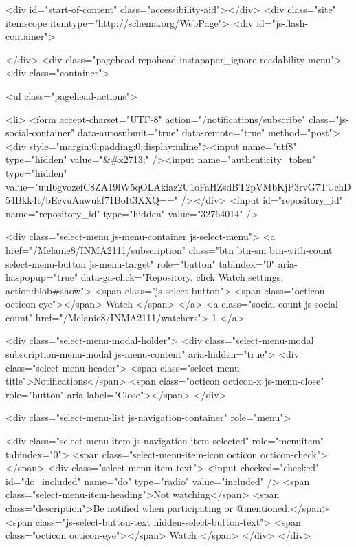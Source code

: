         

        


      <div id="start-of-content" class="accessibility-aid"></div>
          <div class="site" itemscope itemtype="http://schema.org/WebPage">
    <div id="js-flash-container">
      
    </div>
    <div class="pagehead repohead instapaper_ignore readability-menu">
      <div class="container">
        
<ul class="pagehead-actions">

  <li>
      <form accept-charset="UTF-8" action="/notifications/subscribe" class="js-social-container" data-autosubmit="true" data-remote="true" method="post"><div style="margin:0;padding:0;display:inline"><input name="utf8" type="hidden" value="&#x2713;" /><input name="authenticity_token" type="hidden" value="uuI6gvozefC8ZA19lW5qOLAkiaz2U1oFaHZsdBT2pVMbKjP3rvG7TUchD54Bkk4t/bEcvuAuwukf71BoIt3XXQ==" /></div>    <input id="repository_id" name="repository_id" type="hidden" value="32764014" />

      <div class="select-menu js-menu-container js-select-menu">
        <a href="/Melanie8/INMA2111/subscription"
          class="btn btn-sm btn-with-count select-menu-button js-menu-target" role="button" tabindex="0" aria-haspopup="true"
          data-ga-click="Repository, click Watch settings, action:blob#show">
          <span class="js-select-button">
            <span class="octicon octicon-eye"></span>
            Watch
          </span>
        </a>
        <a class="social-count js-social-count" href="/Melanie8/INMA2111/watchers">
          1
        </a>

        <div class="select-menu-modal-holder">
          <div class="select-menu-modal subscription-menu-modal js-menu-content" aria-hidden="true">
            <div class="select-menu-header">
              <span class="select-menu-title">Notifications</span>
              <span class="octicon octicon-x js-menu-close" role="button" aria-label="Close"></span>
            </div>

            <div class="select-menu-list js-navigation-container" role="menu">

              <div class="select-menu-item js-navigation-item selected" role="menuitem" tabindex="0">
                <span class="select-menu-item-icon octicon octicon-check"></span>
                <div class="select-menu-item-text">
                  <input checked="checked" id="do_included" name="do" type="radio" value="included" />
                  <span class="select-menu-item-heading">Not watching</span>
                  <span class="description">Be notified when participating or @mentioned.</span>
                  <span class="js-select-button-text hidden-select-button-text">
                    <span class="octicon octicon-eye"></span>
                    Watch
                  </span>
                </div>
              </div>

